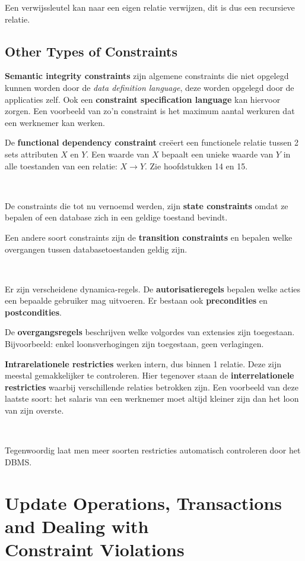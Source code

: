 \noindent Een verwijssleutel kan naar een eigen relatie verwijzen, dit is dus een recursieve relatie.

\subsection{Other Types of Constraints}
\textbf{Semantic integrity constraints} zijn algemene constraints die niet opgelegd kunnen worden door de \textit{data definition language}, deze worden opgelegd door de applicaties zelf. Ook een \textbf{constraint specification language} kan hiervoor zorgen. Een voorbeeld van zo'n constraint is het maximum aantal werkuren dat een werknemer kan werken.

De \textbf{functional dependency constraint} cre\"eert een functionele relatie tussen 2 sets attributen $X$ en $Y$. Een waarde van $X$ bepaalt een unieke waarde van $Y$ in alle toestanden van een relatie: $X \rightarrow Y$. Zie hoofdstukken 14 en 15.

~

\noindent De constraints die tot nu vernoemd werden, zijn \textbf{state constraints} omdat ze bepalen of een database zich in een geldige toestand bevindt.

Een andere soort constraints zijn de \textbf{transition constraints} en bepalen welke overgangen tussen databasetoestanden geldig zijn.

~

\noindent Er zijn verscheidene dynamica-regels. De \textbf{autorisatieregels} bepalen welke acties een bepaalde gebruiker mag uitvoeren. Er bestaan ook \textbf{precondities} en \textbf{postcondities}.

De \textbf{overgangsregels} beschrijven welke volgordes van extensies zijn toegestaan. Bijvoorbeeld: enkel loonsverhogingen zijn toegestaan, geen verlagingen.

\textbf{Intrarelationele restricties} werken intern, dus binnen 1 relatie. Deze zijn meestal gemakkelijker te controleren. Hier tegenover staan de \textbf{interrelationele restricties} waarbij verschillende relaties betrokken zijn. Een voorbeeld van deze laatste soort: het salaris van een werknemer moet altijd kleiner zijn dan het loon van zijn overste.

~

\noindent Tegenwoordig laat men meer soorten restricties automatisch controleren door het DBMS.

\section[Update Operations, Transactions and Dealing with Constraint Violations]{Update Operations, Transactions and Dealing with\\Constraint Violations}


